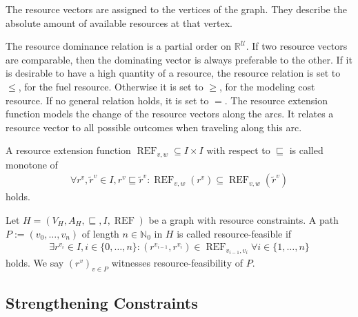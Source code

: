 The resource vectors are assigned to the vertices of the graph. They describe the absolute amount of available resources at that vertex.

The resource dominance relation is a partial order on $\mathbb{R}^{\mathcal{U}}$. If two resource vectors are comparable, then the dominating vector is always preferable to the other. If it is desirable to have a high quantity of a resource, the resource relation is set to $\leq$, \eg for the fuel resource. Otherwise it is set to $\geq$, \eg for the modeling cost resource. If no general relation holds, it is set to $=$. The resource extension function models the change of the resource vectors along the arcs. It relates a resource vector to all possible outcomes when traveling along this arc. 

\begin{definition}

A resource extension function ${\operatorname{REF}_{v,w}\subseteq I\times I}$ with respect to $\sqsubseteq$ is called monotone of
\begin{align*}
	\forall r^v,\tilde{r}^v\in I, r^v\sqsubseteq\tilde{r}^v : \operatorname{REF}_{v,w}\left(r^v\right)\subseteq\operatorname{REF}_{v,w}\left(\tilde{r}^v\right)
\end{align*}
holds.

\end{definition}

\begin{definition}

Let ${H=\left(V_H,A_H,\sqsubseteq,I,\operatorname{REF}\right)}$ be a graph with resource constraints. A path ${P:=\left(v_0,\dots,v_n\right)}$ of length ${n\in\mathbb{N}_0}$ in $H$ is called resource-feasible if
\begin{align*}
	\exists r^{v_i}\in I,i\in\{0,\dots,n\}: \left(r^{v_{i-1}},r^{v_i}\right)\in\operatorname{REF}_{v_{i-1},v_i} \forall i\in\{1,\dots,n\}
\end{align*}
holds. We say $\left(r^v\right)_{v\in P}$ witnesses resource-feasibility of $P$.

\end{definition}


\subsection{Strengthening Constraints}

